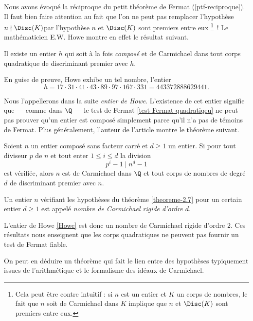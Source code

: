 Nous avons évoqué la réciproque du petit théorème de Fermat (\ref{ptf-reciproque}). Il faut bien faire attention au fait que l'on ne peut pas remplacer l'hypothèse \og $n \nmid \Disc(K)$\fg par l'hypothèse \og $n$ et $\Disc(K)$ sont premiers entre eux \fg \footnote{Cela peut être contre intuitif : si $n$ est un entier et $K$ un corps de nombres, le fait que $n$ soit de Carmichael dans $K$ implique que $n$ et $\Disc(K)$ sont premiers entre eux.}~! Le mathématicien E.W. Howe montre en effet le résultat suivant.

\begin{theoreme}[Howe, 2000]
	Il existe un entier $h$ qui soit à la fois \emph{composé} et de Carmichael dans tout corps quadratique de discriminant premier avec $h$.
\end{theoreme}

En guise de preuve, Howe exhibe un tel nombre, l'entier 
	\begin{equation}\label{Howe}
		h = 17 \cdot 31 \cdot 41 \cdot 43 \cdot 89 \cdot 97 \cdot 167 \cdot 331 = 443372888629441.
	\end{equation}

Nous l'appellerons dans la suite \emph{entier de Howe}. L'existence de cet entier signifie que — comme dans $\Q$ — le test de Fermat \ref{test-Fermat-quadratiqeu} ne peut pas prouver qu'un entier est composé simplement parce qu'il n'a pas de témoins de Fermat. Plus généralement, l'auteur de l'article montre le théorème suivant.

\begin{theoreme}\label{theoreme-2.7}
	Soient $n$ un entier composé sans facteur carré et $d\geq 1$ un entier. Si pour tout diviseur $p$ de $n$ et tout enter $1\leq i \leq d$ la division $$p^i - 1\mid n^d - 1$$ est vérifiée, alors $n$ est de Carmichael dans $\Q$ et tout corps de nombres de degré $d$ de discriminant premier avec $n$.
\end{theoreme}

\begin{definition}
	Un entier $n$ vérifiant les hypothèses du théorème \ref{theoreme-2.7} pour un certain entier $d\geq 1$ est appelé \emph{nombre de Carmichael rigide d'ordre $d$}.
\end{definition}

L'entier de Howe \ref{Howe} est donc un nombre de Carmichael rigide d'ordre $2$. Ces résultats nous enseignent que les corps quadratiques ne peuvent pas fournir un test de Fermat fiable. 

On peut en déduire un théorème qui fait le lien entre des hypothèses typiquement issues de l'arithmétique et le formalisme des idéaux de Carmichael.

